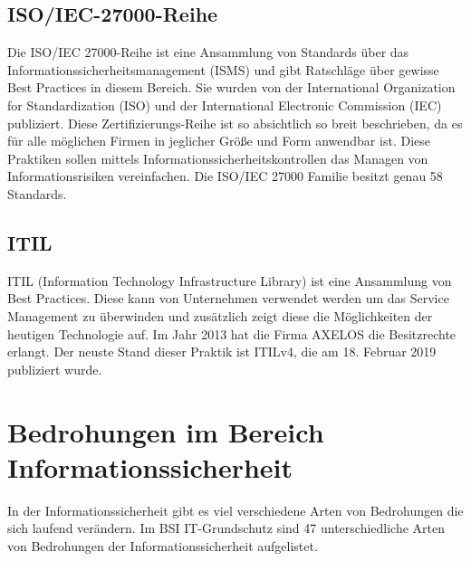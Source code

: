 \subsection{ISO/IEC-27000-Reihe}
Die ISO/IEC 27000-Reihe ist eine Ansammlung von Standards über das Informationssicherheitsmanagement (ISMS) und gibt Ratschläge über gewisse Best Practices in diesem Bereich. Sie wurden von der International Organization for Standardization (ISO) und der International Electronic Commission (IEC) publiziert. 
Diese Zertifizierungs-Reihe ist so absichtlich so breit beschrieben, da es für alle möglichen Firmen in jeglicher Größe und Form anwendbar ist.
Diese Praktiken sollen mittels Informationssicherheitskontrollen das Managen von Informationsrisiken vereinfachen. Die ISO/IEC 27000 Familie besitzt genau 58 Standards.

\subsection{ITIL}
ITIL (Information Technology Infrastructure Library) ist eine Ansammlung von Best Practices. Diese kann von Unternehmen verwendet werden um das Service Management zu überwinden und zusätzlich zeigt diese die Möglichkeiten der heutigen Technologie auf. Im Jahr 2013 hat die Firma AXELOS die Besitzrechte erlangt.
Der neuste Stand dieser Praktik ist ITILv4, die am 18. Februar 2019 publiziert wurde.

\section{Bedrohungen im Bereich Informationssicherheit}
In der Informationssicherheit gibt es viel verschiedene Arten von Bedrohungen die sich laufend verändern. Im BSI IT-Grundschutz sind 47 unterschiedliche Arten von Bedrohungen der Informationssicherheit aufgelistet.


